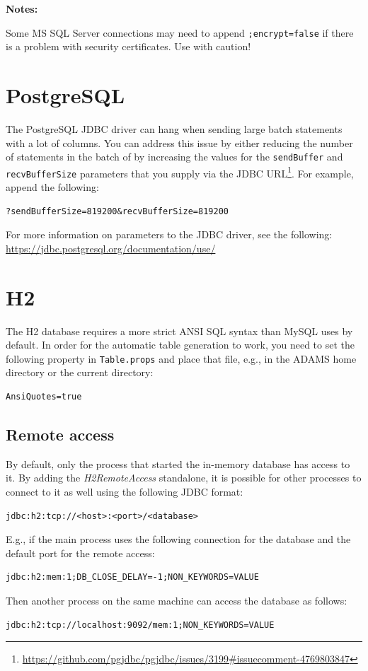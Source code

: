 \documentclass[a4paper]{book}
\begin{document}
\noindent \textbf{Notes:}
\begin{tight_itemize}
    \item Some MS SQL Server connections may need to append \texttt{;encrypt=false} if there is a problem with
    security certificates. Use with caution!
\end{tight_itemize}

\clearpage
\section{PostgreSQL}
The PostgreSQL JDBC driver can hang when sending large batch statements with a lot of columns. You can address
this issue by either reducing the number of statements in the batch of by increasing the values for the
\texttt{sendBuffer} and \texttt{recvBufferSize} parameters that you supply via the JDBC
URL\footnote{\url{https://github.com/pgjdbc/pgjdbc/issues/3199\#issuecomment-4769803847}{}}. For example,
append the following:
\begin{verbatim}
?sendBufferSize=819200&recvBufferSize=819200
\end{verbatim}
For more information on parameters to the JDBC driver, see the following: \\
\url{https://jdbc.postgresql.org/documentation/use/}{}

\clearpage
\section{H2}
The H2 database requires a more strict ANSI SQL syntax than MySQL uses by default.
In order for the automatic table generation to work, you need to set the following property
in \texttt{Table.props} and place that file, e.g., in the ADAMS home directory or the current directory:
\begin{verbatim}
AnsiQuotes=true
\end{verbatim}

\subsection{Remote access}
By default, only the process that started the in-memory database has access to it.
By adding the \textit{H2RemoteAccess} standalone, it is possible for other processes
to connect to it as well using the following JDBC format:
\begin{verbatim}
jdbc:h2:tcp://<host>:<port>/<database>
\end{verbatim}
E.g., if the main process uses the following connection for the database and the default port
for the remote access:
\begin{verbatim}
jdbc:h2:mem:1;DB_CLOSE_DELAY=-1;NON_KEYWORDS=VALUE
\end{verbatim}
Then another process on the same machine can access the database as follows:
\begin{verbatim}
jdbc:h2:tcp://localhost:9092/mem:1;NON_KEYWORDS=VALUE
\end{verbatim}



\end{document}
